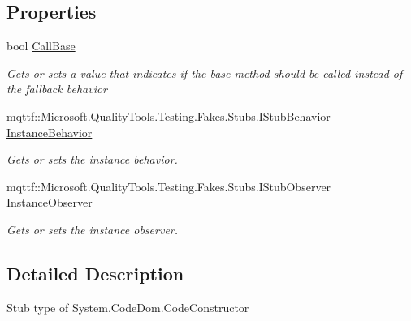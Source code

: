 \subsection*{Properties}
\begin{DoxyCompactItemize}
\item 
bool \hyperlink{class_system_1_1_code_dom_1_1_fakes_1_1_stub_code_constructor_a9c96b72d5c15c1dee55a270327338b86}{Call\-Base}
\begin{DoxyCompactList}\small\item\em Gets or sets a value that indicates if the base method should be called instead of the fallback behavior\end{DoxyCompactList}\item 
mqttf\-::\-Microsoft.\-Quality\-Tools.\-Testing.\-Fakes.\-Stubs.\-I\-Stub\-Behavior \hyperlink{class_system_1_1_code_dom_1_1_fakes_1_1_stub_code_constructor_a7d99ce88089b33068acb5d617529a2e3}{Instance\-Behavior}
\begin{DoxyCompactList}\small\item\em Gets or sets the instance behavior.\end{DoxyCompactList}\item 
mqttf\-::\-Microsoft.\-Quality\-Tools.\-Testing.\-Fakes.\-Stubs.\-I\-Stub\-Observer \hyperlink{class_system_1_1_code_dom_1_1_fakes_1_1_stub_code_constructor_ac7e9e99433f6c8290c637a3338803e23}{Instance\-Observer}
\begin{DoxyCompactList}\small\item\em Gets or sets the instance observer.\end{DoxyCompactList}\end{DoxyCompactItemize}


\subsection{Detailed Description}
Stub type of System.\-Code\-Dom.\-Code\-Constructor



